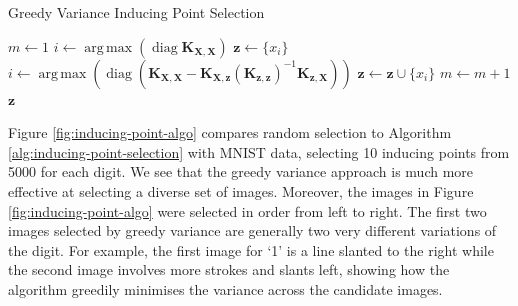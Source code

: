 \documentclass{article}
\newcommand{\diag}{\operatorname{diag}}
\DeclareMathOperator*{\argmax}{arg\,max}
\numberwithin{equation}{section}
\begin{document}
\begin{algorithm}
\caption{Greedy Variance Inducing Point Selection}\label{alg:inducing-point-selection}
\begin{algorithmic}
\State $m \leftarrow 1$
 \State $i \leftarrow \argmax \left(\diag\mathbf{K}_{\mathbf{X}, \mathbf{X}}\right) $
 \State $\mathbf{z} \leftarrow \{x_i\}$ 
\State$i \leftarrow \argmax \left(\diag \left(\mathbf{K}_{\mathbf{X}, \mathbf{X}} - \mathbf{K}_{\mathbf{X}, \mathbf{z}} \left(\mathbf{K}_{\mathbf{z}, \mathbf{z}}\right)^{-1}\mathbf{K}_{\mathbf{z}, \mathbf{X}}\right)\right)$
 \State  $\mathbf{z} \leftarrow \mathbf{z} \cup \{x_i\}$ 
 \State  $m \leftarrow m+1$
\EndWhile
\State \Return $\mathbf{z}$
\end{algorithmic}
\end{algorithm}

Figure \ref{fig:inducing-point-algo} compares random selection to Algorithm \ref{alg:inducing-point-selection} with MNIST data, selecting 10 inducing points from 5000 for each digit. 
We see that the greedy variance approach is much more effective at selecting a diverse set of images.
Moreover, the images in Figure \ref{fig:inducing-point-algo} were selected in order from left to right.
The first two images selected by greedy variance are generally two very different variations of the digit.
For example, the first image for `1' is a line slanted to the right while the second image involves more strokes and slants left, showing how the algorithm greedily minimises the variance across the candidate images.
\end{document}
